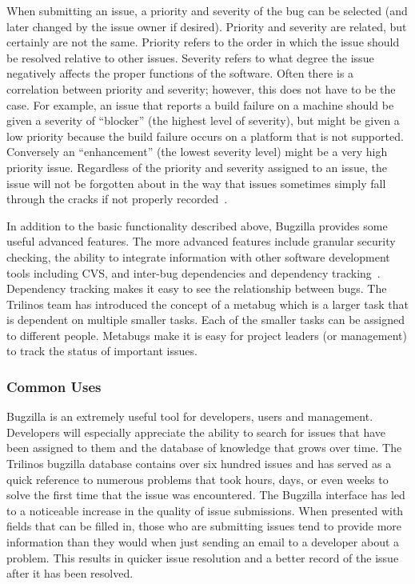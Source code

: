 \documentclass[12pt,relax]{article}
\begin{document}
When submitting an issue, a 
priority and severity of the bug can be selected (and later changed by the 
issue owner if desired).  Priority and severity are related, but certainly are 
not the same.  Priority refers to the order in which the issue should be 
resolved relative to other issues.  Severity refers to what degree the issue 
negatively affects the proper functions of the software.  Often there is a 
correlation between priority and severity; however, this does not have to be
the case.  For example, an issue that reports a build failure on a 
machine should be given a severity of ``blocker'' (the highest level of 
severity), but might be given a low priority because the build failure occurs
on a platform that is not supported.  Conversely an ``enhancement'' (the 
lowest severity level) might be a very high priority issue.  Regardless of the 
priority and severity assigned to an issue, the issue will not be forgotten 
about in the way that issues sometimes simply fall through the cracks if not 
properly recorded~\cite{Bugzilla}.

In addition to the basic functionality described above, Bugzilla provides some 
useful advanced features.  The more advanced features include
granular security checking, the ability to integrate information with 
other software development tools including CVS, and inter-bug 
dependencies and dependency tracking~\cite{Bugzilla}.  Dependency tracking 
makes it easy to see the relationship 
between bugs.  The Trilinos team has introduced the concept of a metabug which 
is a larger task that is dependent on multiple smaller tasks.  Each of the 
smaller tasks can be assigned to different people. Metabugs make it is easy 
for project leaders (or management) to track the status of important issues. 

\subsubsection{Common Uses}

Bugzilla is an extremely useful tool for developers, users and management.  
Developers will especially appreciate the ability to search for issues 
that have been assigned to them and the database of knowledge that grows over
time.  The Trilinos bugzilla database contains over six hundred issues and 
has served as a quick reference to numerous problems that took hours, days, 
or even weeks to solve the first time that the issue was encountered.  The 
Bugzilla interface has led to a noticeable increase in the quality of 
issue submissions.  When presented with fields that can be filled in, those 
who are 
submitting issues tend to provide more information than they would when just 
sending an email to a developer about a problem.  This results in quicker 
issue resolution and a better record of the issue after it has been resolved.  
\end{document}
